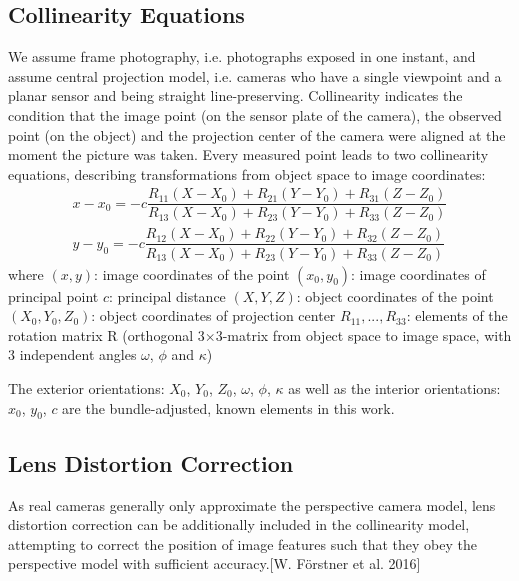 \subsection{Collinearity Equations}
\label{subsec:Collinearity}
We assume frame photography, i.e. photographs exposed in one instant, and assume central projection model, i.e. cameras who have a single viewpoint and a planar sensor and being straight line-preserving. Collinearity indicates the condition that the image point (on the sensor plate of the camera), the observed point (on the object) and the projection center of the camera were aligned at the moment the picture was taken. Every measured point leads to two collinearity equations, describing transformations from object space to image coordinates:
\begin{equation} %
\begin{split}
x - x_0 = -c \dfrac {R_{11}(X-X_0) + R_{21}(Y-Y_0) + R_{31}(Z-Z_0)} {R_{13}(X-X_0) + R_{23}(Y-Y_0) + R_{33}(Z-Z_0)} \\
y - y_0 = -c \dfrac {R_{12}(X-X_0) + R_{22}(Y-Y_0) + R_{32}(Z-Z_0)} {R_{13}(X-X_0) + R_{23}(Y-Y_0) + R_{33}(Z-Z_0)}
\end{split}
\end{equation}
where\newline
$(x, y)$: image coordinates of the point \newline
$(x_0, y_0)$: image coordinates of principal point \newline
$c$: principal distance \newline
$(X, Y, Z)$: object coordinates of the point \newline
$(X_0, Y_0, Z_0)$: object coordinates of projection center \newline
$R_{11},...,R_{33}$: elements of the rotation matrix R (orthogonal 3$\times$3-matrix from object space to image space, with 3 independent angles $\omega$, $\phi$ and $\kappa$)

The exterior orientations: $X_0$, $Y_0$, $Z_0$, $\omega$, $\phi$, $\kappa$ as well as the interior orientations: $x_0$, $y_0$, $c$ are the bundle-adjusted, known elements in this work.

\subsection{Lens Distortion Correction}
\label{subsec:LensDistortion}

As real cameras generally only approximate the perspective camera model, lens distortion correction can be additionally included in the collinearity model, attempting to correct the position of image features such that they obey the perspective model with sufficient accuracy.[W. Förstner et al. 2016] 

